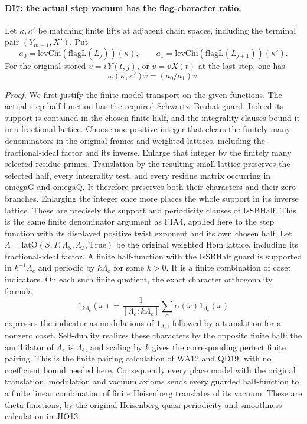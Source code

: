 \paragraph{DI7: the actual step vacuum has the flag-character ratio.}
\label{claim:DI7}
Let \(\kappa,\kappa'\) be matching finite lifts at adjacent chain
spaces, including the terminal pair \((Y_{m-1},X')\). Put
\[
 a_0=\mathrm{levChi}(\mathrm{flagL}(L_j))(\kappa),\qquad
 a_1=\mathrm{levChi}(\mathrm{flagL}(L_{j+1}))(\kappa').
\]
For the original stored \(v=vY(t,j)\), or \(v=vX(t)\) at the
last step, one has
\[
                 \omega(\kappa,\kappa')v=(a_0/a_1)v.
 \tag{DI.14}
\]

\emph{Proof.}
We first justify the finite-model transport on the given functions.
The actual step half-function has the required Schwartz--Bruhat
guard. Indeed its support is contained in the chosen finite half,
and the integrality clauses bound it in a fractional lattice.
Choose one positive integer that clears the finitely many
denominators in the original frames and weighted lattices, including
the fractional-ideal factor and its inverse. Enlarge that integer
by the finitely many selected residue primes. Translation by the
resulting small lattice preserves the selected half, every
integrality test, and every residue matrix occurring in
\(\mathrm{omegaG}\) and \(\mathrm{omegaQ}\). It therefore
preserves both their characters and their zero branches. Enlarging
the integer once more places the whole support in its inverse
lattice. These are precisely the support and periodicity clauses
of \(\mathrm{IsSBHalf}\). This is the same finite denominator
argument as FIA4, applied here to the step function with its
displayed positive twist exponent and its own chosen half.
Let \(\Lambda=\mathrm{latO}(S,T,\Lambda_S,\Lambda_T,\mathrm{True})\)
be the original weighted Hom lattice, including its fractional-ideal
factor. A finite half-function with the \(\mathrm{IsSBHalf}\) guard
is supported in \(k^{-1}\Lambda_e\) and periodic by
\(k\Lambda_e\) for some \(k>0\). It is a finite combination of
coset indicators. On each such finite quotient, the exact character
orthogonality formula
\[
  1_{k\Lambda_e}(x)=\frac1{[\Lambda_e:k\Lambda_e]}
       \sum_{\alpha}\alpha(x)1_{\Lambda_e}(x)
 \tag{DI.15}
\]
expresses the indicator as modulations of \(1_{\Lambda_e}\),
followed by a translation for a nonzero coset. Self-duality realizes
these characters by the opposite finite half: the annihilator of
\(\Lambda_e\) is \(\Lambda_{\bar e}\), and scaling by \(k\)
gives the corresponding perfect finite pairing. This is the finite
pairing calculation of WA12 and QD19, with no coefficient bound needed
here. Consequently every place model with the original translation,
modulation and vacuum axioms sends every guarded half-function to a
finite linear combination of finite Heisenberg translates of its
vacuum. These are theta functions, by the original Heisenberg
quasi-periodicity and smoothness calculation in JIO13.

